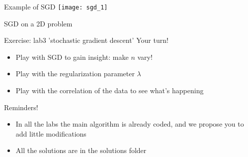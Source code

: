 \begin{frame}{Example of SGD}
    \centering
    \texttt{[image: sgd\_1]}

    SGD on a 2D problem
\end{frame}

\begin{frame}{Exercise: lab3 'stochastic gradient descent'}
    Your turn!

    \begin{itemize}
        \item  Play with SGD to gain insight: make $n$ vary!
        \item Play with the regularization parameter $\lambda$
        \item Play with the correlation of the data to see what's happening
    \end{itemize}

    \vspace{2em}

    Reminders!
    \begin{itemize}
        \item In all the labs the main algorithm is already coded, and we propose you to add little modifications
        \item All the solutions are in the solutions folder
    \end{itemize}
\end{frame}
